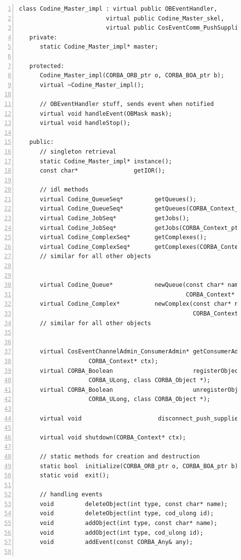 \begin{Verbatim}[frame=lines, numbers=left, fontsize=\small, framerule=1mm]
class Codine_Master_impl : virtual public OBEventHandler, 
                         virtual public Codine_Master_skel, 
                         virtual public CosEventComm_PushSupplier_skel {
   private:
      static Codine_Master_impl* master;

   protected:
      Codine_Master_impl(CORBA_ORB_ptr o, CORBA_BOA_ptr b);
      virtual ~Codine_Master_impl();

      // OBEventHandler stuff, sends event when notified
      virtual void handleEvent(OBMask mask);
      virtual void handleStop();

   public:
      // singleton retrieval
      static Codine_Master_impl* instance();
      const char*                getIOR();

      // idl methods
      virtual Codine_QueueSeq*         getQueues();
      virtual Codine_QueueSeq*         getQueues(CORBA_Context_ptr ctx);
      virtual Codine_JobSeq*           getJobs();
      virtual Codine_JobSeq*           getJobs(CORBA_Context_ptr ctx);
      virtual Codine_ComplexSeq*       getComplexes();
      virtual Codine_ComplexSeq*       getComplexes(CORBA_Context* ctx);
      // similar for all other objects


      virtual Codine_Queue*            newQueue(const char* name,
                                                CORBA_Context* ctx);
      virtual Codine_Complex*          newComplex(const char* name,
                                                  CORBA_Context* ctx);
      // similar for all other objects


      virtual CosEventChannelAdmin_ConsumerAdmin* getConsumerAdmin(
                    CORBA_Context* ctx);
      virtual CORBA_Boolean                       registerObject(
                    CORBA_ULong, class CORBA_Object *);
      virtual CORBA_Boolean                       unregisterObject(
                    CORBA_ULong, class CORBA_Object *);

      virtual void                      disconnect_push_supplier();

      virtual void shutdown(CORBA_Context* ctx);

      // static methods for creation and destruction
      static bool  initialize(CORBA_ORB_ptr o, CORBA_BOA_ptr b); 
      static void  exit();
      
      // handling events
      void         deleteObject(int type, const char* name);
      void         deleteObject(int type, cod_ulong id);
      void         addObject(int type, const char* name);
      void         addObject(int type, cod_ulong id);
      void         addEvent(const CORBA_Any& any);


\end{Verbatim}
